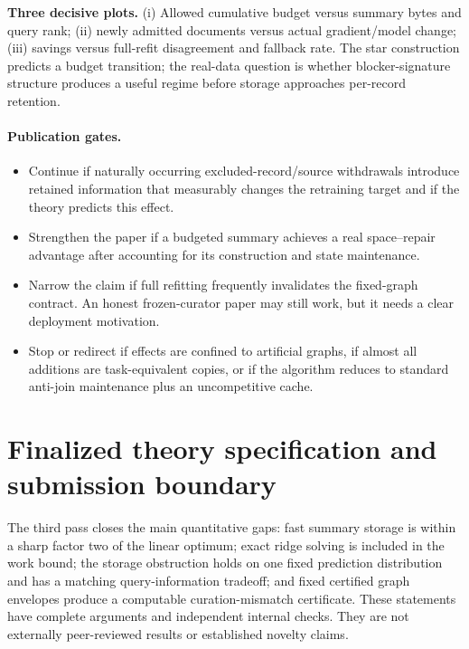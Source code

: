 \documentclass[11pt,a4paper]{article}
\theoremstyle{definition}\newtheorem{definition}[theorem]{Definition}
\begin{document}
\textbf{Three decisive plots.} (i) Allowed cumulative budget versus summary bytes and query rank; (ii) newly admitted documents versus actual gradient/model change; (iii) savings versus full-refit disagreement and fallback rate. The star construction predicts a budget transition; the real-data question is whether blocker-signature structure produces a useful regime before storage approaches per-record retention.

\paragraph{Publication gates.}
\begin{itemize}
\item Continue if naturally occurring excluded-record/source withdrawals introduce retained information that measurably changes the retraining target and if the theory predicts this effect.
\item Strengthen the paper if a budgeted summary achieves a real space--repair advantage after accounting for its construction and state maintenance.
\item Narrow the claim if full refitting frequently invalidates the fixed-graph contract. An honest frozen-curator paper may still work, but it needs a clear deployment motivation.
\item Stop or redirect if effects are confined to artificial graphs, if almost all additions are task-equivalent copies, or if the algorithm reduces to standard anti-join maintenance plus an uncompetitive cache.
\end{itemize}

\section{Finalized theory specification and submission boundary}
The third pass closes the main quantitative gaps: fast summary storage is within a sharp factor two of the linear optimum; exact ridge solving is included in the work bound; the storage obstruction holds on one fixed prediction distribution and has a matching query-information tradeoff; and fixed certified graph envelopes produce a computable curation-mismatch certificate. These statements have complete arguments and independent internal checks. They are not externally peer-reviewed results or established novelty claims.
\end{document}

